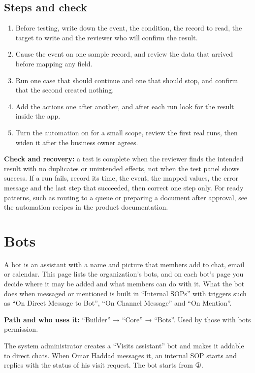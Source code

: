 \subsection{Steps and check}
\begin{enumerate}
\item Before testing, write down the event, the condition, the record to read, the target to write and the reviewer who will confirm the result.
\item Cause the event on one sample record, and review the data that arrived before mapping any field.
\item Run one case that should continue and one that should stop, and confirm that the second created nothing.
\item Add the actions one after another, and after each run look for the result inside the app.
\item Turn the automation on for a small scope, review the first real runs, then widen it after the business owner agrees.
\end{enumerate}

\textbf{Check and recovery:} a test is complete when the reviewer finds the intended result with no duplicates or unintended effects, not when the test panel shows success. If a run fails, record its time, the event, the mapped values, the error message and the last step that succeeded, then correct one step only. For ready patterns, such as routing to a queue or preparing a document after approval, see the automation recipes in the product documentation.

\clearpage
\section{Bots}
\label{sec:builder-feature-bots}

A bot is an assistant with a name and picture that members add to chat, email or calendar. This page lists the organization's bots, and on each bot's page you decide where it may be added and what members can do with it. What the bot does when messaged or mentioned is built in “Internal SOPs” with triggers such as “On Direct Message to Bot”, “On Channel Message” and “On Mention”.

\textbf{Path and who uses it:} “Builder” → “Core” → “Bots”. Used by those with bots permission.

\begin{rcnote}
The system administrator creates a “Visits assistant” bot and makes it addable to direct chats. When Omar Haddad messages it, an internal SOP starts and replies with the status of his visit request. The bot starts from ①.
\end{rcnote}


